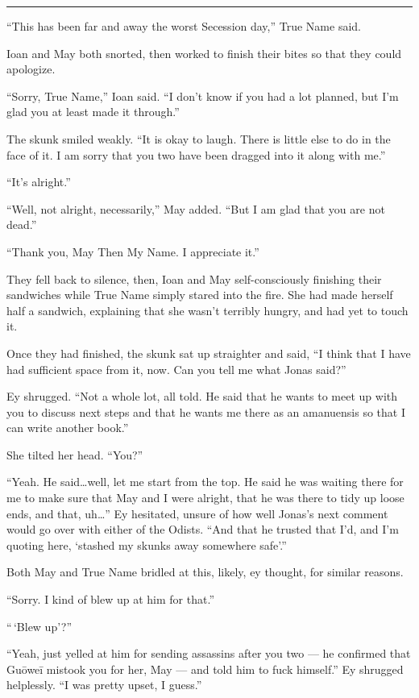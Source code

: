 \begin{center}\rule{0.5\linewidth}{0.5pt}\end{center}

``This has been far and away the worst Secession day,'' True Name said.

Ioan and May both snorted, then worked to finish their bites so that they could apologize.

``Sorry, True Name,'' Ioan said. ``I don't know if you had a lot planned, but I'm glad you at least made it through.''

The skunk smiled weakly. ``It is okay to laugh. There is little else to do in the face of it. I am sorry that you two have been dragged into it along with me.''

``It's alright.''

``Well, not alright, necessarily,'' May added. ``But I am glad that you are not dead.''

``Thank you, May Then My Name. I appreciate it.''

They fell back to silence, then, Ioan and May self-consciously finishing their sandwiches while True Name simply stared into the fire. She had made herself half a sandwich, explaining that she wasn't terribly hungry, and had yet to touch it.

Once they had finished, the skunk sat up straighter and said, ``I think that I have had sufficient space from it, now. Can you tell me what Jonas said?''

Ey shrugged. ``Not a whole lot, all told. He said that he wants to meet up with you to discuss next steps and that he wants me there as an amanuensis so that I can write another book.''

She tilted her head. ``You?''

``Yeah. He said\ldots well, let me start from the top. He said he was waiting there for me to make sure that May and I were alright, that he was there to tidy up loose ends, and that, uh\ldots{}'' Ey hesitated, unsure of how well Jonas's next comment would go over with either of the Odists. ``And that he trusted that I'd, and I'm quoting here, `stashed my skunks away somewhere safe'.''

Both May and True Name bridled at this, likely, ey thought, for similar reasons.

``Sorry. I kind of blew up at him for that.''

``\,`Blew up'?''

``Yeah, just yelled at him for sending assassins after you two — he confirmed that Guōweī mistook you for her, May — and told him to fuck himself.'' Ey shrugged helplessly. ``I was pretty upset, I guess.''


